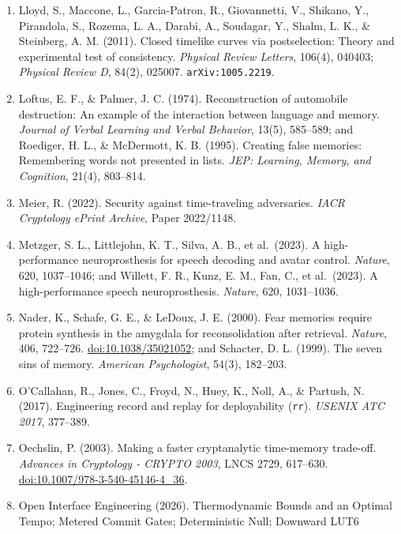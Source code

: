 \documentclass[10pt,letterpaper]{article}
\begin{document}
\begin{enumerate}
  \emph{Proceedings of the Royal Society A}, 473(2202), 20160607.
  \texttt{arXiv:1607.\allowbreak{}07871}.
\item
  Lloyd, S., Maccone, L., Garcia-Patron, R., Giovannetti, V., Shikano,
  Y., Pirandola, S., Rozema, L. A., Darabi, A., Soudagar, Y., Shalm, L.
  K., \& Steinberg, A. M. (2011). Closed timelike curves via
  postselection: Theory and experimental test of consistency.
  \emph{Physical Review Letters}, 106(4), 040403; \emph{Physical Review
  D}, 84(2), 025007. \texttt{arXiv:1005.\allowbreak{}2219}.
\item
  Loftus, E. F., \& Palmer, J. C. (1974). Reconstruction of automobile
  destruction: An example of the interaction between language and
  memory. \emph{Journal of Verbal Learning and Verbal Behavior}, 13(5),
  585--589; and Roediger, H. L., \& McDermott, K. B. (1995). Creating
  false memories: Remembering words not presented in lists. \emph{JEP:
  Learning, Memory, and Cognition}, 21(4), 803--814.
\item
  Meier, R. (2022). Security against time-traveling adversaries.
  \emph{IACR Cryptology ePrint Archive}, Paper 2022/1148.
\item
  Metzger, S. L., Littlejohn, K. T., Silva, A. B., et al.~(2023). A
  high-performance neuroprosthesis for speech decoding and avatar
  control. \emph{Nature}, 620, 1037--1046; and Willett, F. R., Kunz, E.
  M., Fan, C., et al.~(2023). A high-performance speech neuroprosthesis.
  \emph{Nature}, 620, 1031--1036.
\item
  Nader, K., Schafe, G. E., \& LeDoux, J. E. (2000). Fear memories
  require protein synthesis in the amygdala for reconsolidation after
  retrieval. \emph{Nature}, 406, 722--726.
  \href{https://doi.org/10.1038/35021052}{doi:10.1038/35021052}; and
  Schacter, D. L. (1999). The seven sins of memory. \emph{American
  Psychologist}, 54(3), 182--203.
\item
  O'Callahan, R., Jones, C., Froyd, N., Huey, K., Noll, A., \& Partush,
  N. (2017). Engineering record and replay for deployability
  (\texttt{rr}). \emph{USENIX ATC 2017}, 377--389.
\item
  Oechslin, P. (2003). Making a faster cryptanalytic time-memory
  trade-off. \emph{Advances in Cryptology - CRYPTO 2003}, LNCS 2729,
  617--630.
  \href{https://doi.org/10.1007/978-3-540-45146-4_36}{doi:10.1007/978-3-540-45146-4\_36}.
\item
  Open Interface Engineering (2026). Thermodynamic Bounds and an Optimal
  Tempo; Metered Commit Gates; Deterministic Null; Downward LUT6

\end{enumerate}
\end{document}
